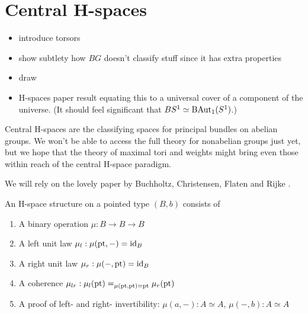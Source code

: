 \section{Central H-spaces}

\begin{itemize}
\item introduce torsors
\item show subtlety how \( BG \) doesn't classify stuff since it has extra properties
\item draw 
\item H-spaces paper result equating this to a universal cover of a component of the universe. (It should feel significant that \( BS^1\simeq \mathrm{BAut}_1(S^1) \).)
\end{itemize}



Central H-spaces are the classifying spaces for principal bundles on abelian groups. We won't be able to access the full theory for nonabelian groups just yet, but we hope that the theory of maximal tori and weights might bring even those within reach of the central H-space paradigm.

We will rely on the lovely paper by Buchholtz, Christensen, Flaten and Rijke \cite{buchholtz2023central}. 

\begin{mydef}
An H-space structure on a pointed type \( (B,b) \) consists of
\begin{enumerate}
\item A binary operation \( \mu:B\to B\to B \)
\item A left unit law \( \mu_l:\mu(\mathrm{pt},-)=\text{id}_B \)
\item A right unit law \( \mu_r:\mu(-,\mathrm{pt})=\text{id}_B \)
\item A coherence \( \mu_{lr}:\mu_l(\mathrm{pt})=_{\mu(\mathrm{pt},\mathrm{pt})=\mathrm{pt}}\mu_r(\mathrm{pt}) \)
\item A proof of left- and right- invertibility: \( \mu(a,-):A\simeq A \), \( \mu(-, b):A\simeq A \)
\end{enumerate}
\end{mydef}

